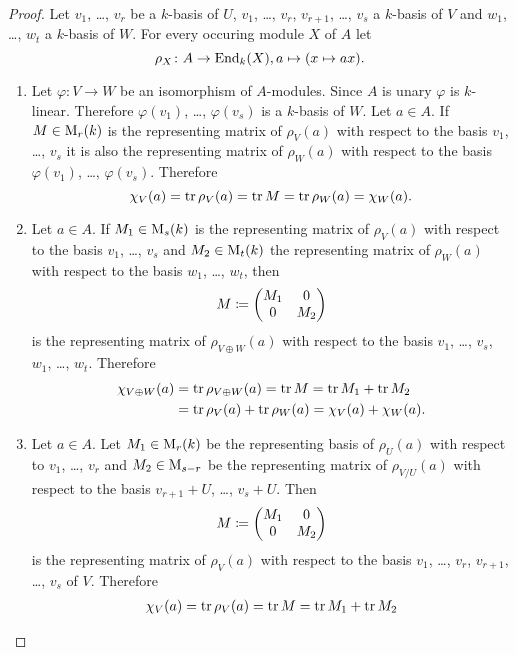 \begin{proof}
  Let $v_1$, \dots, $v_r$ be a $k$-basis of $U$, $v_1$, \dots, $v_r$, $v_{r+1}$, \dots, $v_s$ a $k$-basis of $V$ and $w_1$, \dots, $w_t$ a $k$-basis of $W$. For every occuring module $X$ of $A$ let
  \[
    \rho_X \colon A \to \operatorname{End}_k(X), a \mapsto (x \mapsto ax).
  \]
  \begin{enumerate}[label=\emph{\alph*)},leftmargin=*]
    \item
      Let $\varphi \colon V \to W$ be an isomorphism of $A$-modules. Since $A$ is unary $\varphi$ is $k$-linear. Therefore $\varphi(v_1)$, \dots, $\varphi(v_s)$ is a $k$-basis of $W$. Let $a \in A$. If $M \in \operatorname{M}_r(k)$ is the representing matrix of $\rho_V(a)$ with respect to the basis $v_1$, \dots, $v_s$ it is also the representing matrix of $\rho_W(a)$ with respect to the basis $\varphi(v_1)$, \dots, $\varphi(v_s)$. Therefore
      \[
        \chi_V(a) = \operatorname{tr} \rho_V(a) = \operatorname{tr} M = \operatorname{tr} \rho_W(a) = \chi_W(a).
      \]
    \item
      Let $a \in A$. If $M_1 \in \operatorname{M}_s(k)$ is the representing matrix of $\rho_V(a)$ with respect to the basis $v_1$, \dots, $v_s$ and $M_2 \in \operatorname{M}_t(k)$ the representing matrix of $\rho_W(a)$ with respect to the basis $w_1$, \dots, $w_t$, then
      \[
        M \coloneqq \begin{pmatrix}M_1 & 0  \\ 0 & M_2\end{pmatrix}
      \]
      is the representing matrix of $\rho_{V \oplus W}(a)$ with respect to the basis $v_1$, \dots, $v_s$, $w_1$, \dots, $w_t$. Therefore
      \begin{align*}
        \chi_{V \oplus W}(a)
        &= \operatorname{tr} \rho_{V \oplus W}(a)
        = \operatorname{tr} M
        = \operatorname{tr} M_1 + \operatorname{tr} M_2 \\
        &= \operatorname{tr} \rho_V(a) + \operatorname{tr} \rho_W(a)
        = \chi_V(a) + \chi_W(a).
      \end{align*}
    \item
      Let $a \in A$. Let $M_1 \in \operatorname{M}_r(k)$ be the representing basis of $\rho_U(a)$ with respect to $v_1$, \dots, $v_r$ and $M_2 \in \operatorname{M}_{s-r}$ be the representing matrix of $\rho_{V/U}(a)$ with respect to the basis $v_{r+1} + U$, \dots, $v_s + U$. Then
      \[
        M \coloneqq \begin{pmatrix}M_1 & 0 \\ 0 & M_2\end{pmatrix}
      \]
      is the representing matrix of $\rho_V(a)$ with respect to the basis $v_1$, \dots, $v_r$, $v_{r+1}$, \dots, $v_s$ of $V$. Therefore
      \begin{align*}
        \chi_V(a)
        &= \tr \rho_V(a)
        = \tr M
        = \tr M_1 + \tr M_2 \\

\end{align*}
\end{enumerate}
\end{proof}
